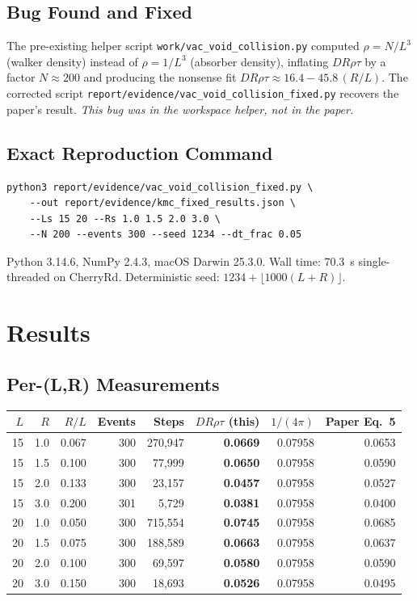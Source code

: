 \documentclass[11pt]{article}
\begin{document}
\subsection{Bug Found and Fixed}
The pre-existing helper script \texttt{work/vac\_void\_collision.py} computed
$\rho = N/L^3$ (walker density) instead of $\rho = 1/L^3$ (absorber density),
inflating $D R \rho \tau$ by a factor $N \approx 200$ and producing the
nonsense fit $D R \rho \tau \approx 16.4 - 45.8\,(R/L)$. The corrected script
\texttt{report/evidence/vac\_void\_collision\_fixed.py} recovers the paper's
result. \emph{This bug was in the workspace helper, not in the paper.}

\subsection{Exact Reproduction Command}
\begin{verbatim}
python3 report/evidence/vac_void_collision_fixed.py \
    --out report/evidence/kmc_fixed_results.json \
    --Ls 15 20 --Rs 1.0 1.5 2.0 3.0 \
    --N 200 --events 300 --seed 1234 --dt_frac 0.05
\end{verbatim}
Python 3.14.6, NumPy 2.4.3, macOS Darwin 25.3.0. Wall time: \SI{70.3}{\second}
single-threaded on CherryRd. Deterministic seed:
$1234 + \lfloor 1000(L+R)\rfloor$.

\section{Results}
\subsection{Per-(L,R) Measurements}
\begin{center}
\small
\begin{tabular}{rrrrrrrr}
\toprule
$L$ & $R$ & $R/L$ & Events & Steps & $D R \rho \tau$ (this) & $1/(4\pi)$ & Paper Eq.~5 \\
\midrule
15 & 1.0 & 0.067 & 300 & 270{,}947 & \textbf{0.0669} & 0.07958 & 0.0653 \\
15 & 1.5 & 0.100 & 300 &  77{,}999 & \textbf{0.0650} & 0.07958 & 0.0590 \\
15 & 2.0 & 0.133 & 300 &  23{,}157 & \textbf{0.0457} & 0.07958 & 0.0527 \\
15 & 3.0 & 0.200 & 301 &   5{,}729 & \textbf{0.0381} & 0.07958 & 0.0400 \\
20 & 1.0 & 0.050 & 300 & 715{,}554 & \textbf{0.0745} & 0.07958 & 0.0685 \\
20 & 1.5 & 0.075 & 300 & 188{,}589 & \textbf{0.0663} & 0.07958 & 0.0637 \\
20 & 2.0 & 0.100 & 300 &  69{,}597 & \textbf{0.0580} & 0.07958 & 0.0590 \\
20 & 3.0 & 0.150 & 300 &  18{,}693 & \textbf{0.0526} & 0.07958 & 0.0495 \\
\bottomrule
\end{tabular}
\end{center}
\end{document}
